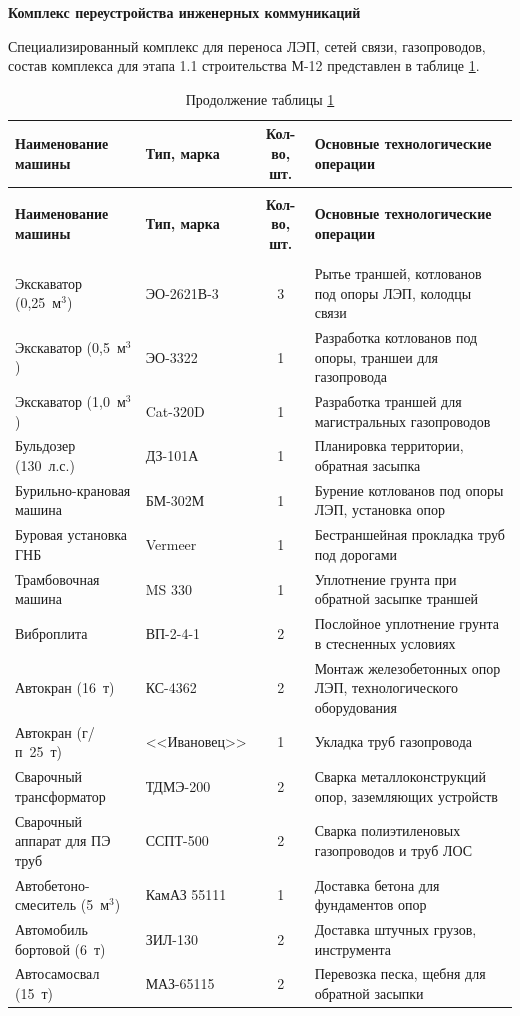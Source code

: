 \textbf{Комплекс переустройства инженерных коммуникаций}

Специализированный комплекс для переноса ЛЭП, сетей связи, газопроводов, состав комплекса для этапа 1.1 строительства М-12 представлен в таблице \ref{tab:relocation_complex_qty}.

\begin{longtable}{|>{\raggedright\arraybackslash}p{3.8cm}|>{\raggedright\arraybackslash}p{3.2cm}|c|>{\raggedright\arraybackslash}p{5.0cm}|}
	\caption{Состав комплекса машин для переустройства коммуникаций} \label{tab:relocation_complex_qty} \\
	\hline
	\textbf{Наименование машины} & \textbf{Тип, марка} & \textbf{Кол-во, шт.} & \textbf{Основные технологические операции} \\
	\hline
	\endfirsthead
	\caption*{Продолжение таблицы \ref{tab:relocation_complex_qty}} \\
	\hline
	\textbf{Наименование машины} & \textbf{Тип, марка} & \textbf{Кол-во, шт.} & \textbf{Основные технологические операции} \\
	\hline
	\endhead
	\hline
	\multicolumn{4}{r}{\small Продолжение на следующей странице} \\
	\endfoot
	\hline
	\endlastfoot
	Экскаватор (0,25~м\(^3\)) & ЭО-2621В-3 & 3 & Рытье траншей, котлованов под опоры ЛЭП, колодцы связи \\
	Экскаватор (0,5~м\(^3\)) & ЭО-3322 & 1 & Разработка котлованов под опоры, траншеи для газопровода \\
	Экскаватор (1,0~м\(^3\)) & Cat-320D & 1 & Разработка траншей для магистральных газопроводов \\
	Бульдозер (130~л.с.) & ДЗ-101А & 1 & Планировка территории, обратная засыпка \\
	Бурильно-крановая машина & БМ-302М & 1 & Бурение котлованов под опоры ЛЭП, установка опор \\
	Буровая установка ГНБ & Vermeer & 1 & Бестраншейная прокладка труб под дорогами \\
	Трамбовочная машина & MS 330 & 1 & Уплотнение грунта при обратной засыпке траншей \\
	Виброплита & ВП-2-4-1 & 2 & Послойное уплотнение грунта в стесненных условиях \\
	Автокран (16~т) & КС-4362 & 2 & Монтаж железобетонных опор ЛЭП, технологического оборудования \\
	Автокран (г/п~25~т) & <<Ивановец>> & 1 & Укладка труб газопровода \\
	Сварочный трансформатор & ТДМЭ-200 & 2 & Сварка металлоконструкций опор, заземляющих устройств \\
	Сварочный аппарат для ПЭ труб & ССПТ-500 & 2 & Сварка полиэтиленовых газопроводов и труб ЛОС \\
	Автобетоно-смеситель (5~м\(^3\)) & КамАЗ 55111 & 1 & Доставка бетона для фундаментов опор \\
	Автомобиль бортовой (6~т) & ЗИЛ-130 & 2 & Доставка штучных грузов, инструмента \\
	Автосамосвал (15~т) & МАЗ-65115 & 2 & Перевозка песка, щебня для обратной засыпки \\
\end{longtable}

